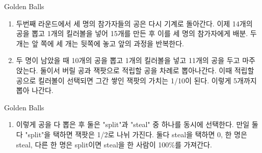 \documentclass[final]{beamer}
\newcounter{saveenumi}
\newcommand{\seti}{\setcounter{saveenumi}{\value{enumi}}}
\newcommand{\conti}{\setcounter{enumi}{\value{saveenumi}}}
\begin{document}
\begin{frame}[t]{Golden Balls}
	\begin{enumerate}
	 \conti
	 \item 두번째 라운드에서 세 명의 참가자들의 공은 다시 기계로 돌아간다. 이제 14개의 공을 뽑고 1개의 킬러볼을 넣어 15개를 만든 후 이를 세 명의 참가자에게 배분. 두 개는 앞 쪽에 세 개는 뒷쪽에 놓고 앞의 과정을 반복한다. 
	\item 두 명이 남았을 때 10개의 공을 뽑고 1개의 킬러볼을 넣고 11개의 공을 두고 마주 앉는다. 둘이서 버릴 공과 잭팟으로 적립할 공을 차례로 뽑아나간다. 이때 적립할 공으로 킬러볼이 선택되면 그간 쌓인 잭팟의 가치는 1/10이 된다. 이렇게 5개까지 뽑아 나간다. 
	\conti
	\end{enumerate}
\end{frame}

\begin{frame}[t]{Golden Balls}
	\begin{enumerate}
		 \conti
		 \item 이렇게 공을 다 뽑은 후 둘은 "split"과 "steal" 중 하나를 동시에 선택한다. 만일 둘 다 "split"을 택하면 잭팟은 1/2로 나뉘 가진다. 둘다 steal을 택하면 0, 한 명은 steal, 다른 한 명은 split이면 steal을 한 사람이 100{\%}를 가져간다.  
		\seti
	\end{enumerate}
	\vspace{5mm}
	\begin{center}
	\end{center}
\end{frame}
\end{document}

